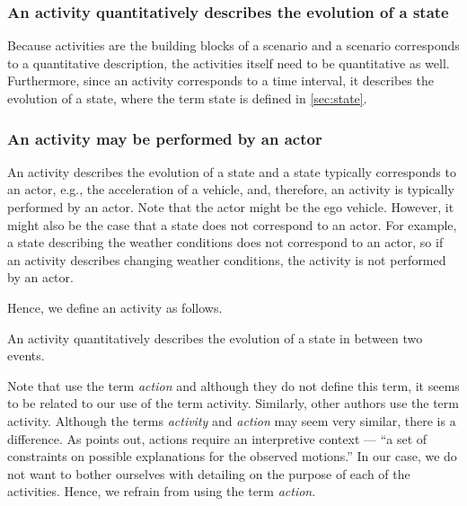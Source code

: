 \subsubsection{An activity quantitatively describes the evolution of a state}
Because activities are the building blocks of a scenario and a scenario corresponds to a quantitative description, the activities itself need to be quantitative as well. Furthermore, since an activity corresponds to a time interval, it describes the evolution of a state, where the term state is defined in \cref{sec:state}.

\subsubsection{An activity may be performed by an actor}
An activity describes the evolution of a state and a state typically corresponds to an actor, e.g., the acceleration of a vehicle, and, therefore, an activity is typically performed by an actor. Note that the actor might be the ego vehicle. However, it might also be the case that a state does not correspond to an actor. For example, a state describing the weather conditions does not correspond to an actor, so if an activity describes changing weather conditions, the activity is not performed by an actor.

Hence, we define an activity as follows.
\begin{definition}[Activity]
	\label{def:activity}
	An activity quantitatively describes the evolution of a state in between two events.
\end{definition}


Note that \textcite{geyer2014, ulbrich2015} use the term \emph{action} and although they do not define this term, it seems to be related to our use of the term activity. Similarly, other authors \cite{sigsim2019glossary, catapult2018musicc, elrofai2018scenario} use the term activity. Although the terms \emph{activity} and \emph{action} may seem very similar, there is a difference. As \textcite{bobick1997movement} points out, actions require an interpretive context --- ``a set of constraints on possible explanations for the observed motions.'' In our case, we do not want to bother ourselves with detailing on the purpose of each of the activities. Hence, we refrain from using the term \emph{action}.


